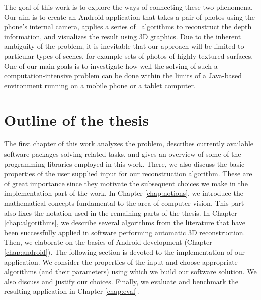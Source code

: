 The goal of this work is to explore the ways of connecting these two phenomena. 
Our aim is to create an Android application that takes a pair of photos using the phone's internal camera, applies a series of \cv\ algorithms to reconstruct the depth information, and visualizes the result using 3D graphics. %
Due to the inherent ambiguity of the problem, it is inevitable that our approach will be limited to particular types of scenes, for example sets of photos of highly textured surfaces. 
One of our main goals is to investigate how well the solving of such a computation-intensive problem can be done within the limits of a Java-based environment running on a mobile phone or a tablet computer.

\section*{Outline of the thesis}

The first chapter of this work analyzes the problem, describes currently available software packages solving related tasks, and gives an overview of some of the programming libraries employed in this work.
There, we also discuss the basic properties of the user supplied input for our reconstruction algorithm. 
These are of great importance since they motivate the subsequent choices we make in the implementation part of the work.
In Chapter \ref{chap:notions}, we introduce the mathematical concepts fundamental to the area of computer vision. 
This part also fixes the notation used in the remaining parts of the thesis. 
In Chapter \ref{chap:algorithms}, we describe several algorithms from the literature that have been successfully applied in software performing automatic 3D reconstruction. 
Then, we elaborate on the basics of Android development (Chapter \ref{chap:android}).
The following section is devoted to the implementation of our application.
We consider the properties of the input and choose appropriate algorithms (and their parameters) using which we build our software solution. 
We also discuss and justify our choices. 
Finally, we evaluate and benchmark the resulting application in Chapter \ref{chap:eval}.

